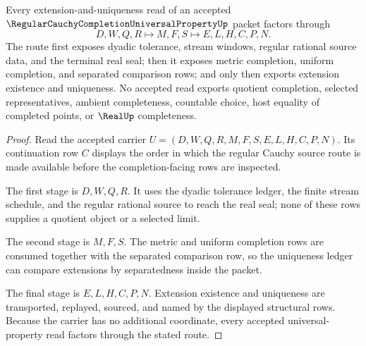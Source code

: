 \begin{theorem}
\label{thm:regular-cauchy-completion-universal-property-core}
Every extension-and-uniqueness read of an accepted $\RegularCauchyCompletionUniversalPropertyUp$ packet factors through
$$
D,W,Q,R \longmapsto M,F,S \longmapsto E,L,H,C,P,N .
$$
The route first exposes dyadic tolerance, stream windows, regular rational source data, and the terminal real seal; then it exposes metric completion, uniform completion, and separated comparison rows; and only then exports extension existence and uniqueness. No accepted read exports quotient completion, selected representatives, ambient completeness, countable choice, host equality of completed points, or $\RealUp$ completeness.
\end{theorem}
\begin{proof}
Read the accepted carrier $U=(D,W,Q,R,M,F,S,E,L,H,C,P,N)$. Its continuation row $C$ displays the order in which the regular Cauchy source route is made available before the completion-facing rows are inspected.

The first stage is $D,W,Q,R$. It uses the dyadic tolerance ledger, the finite stream schedule, and the regular rational source to reach the real seal; none of these rows supplies a quotient object or a selected limit.

The second stage is $M,F,S$. The metric and uniform completion rows are consumed together with the separated comparison row, so the uniqueness ledger can compare extensions by separatedness inside the packet.

The final stage is $E,L,H,C,P,N$. Extension existence and uniqueness are transported, replayed, sourced, and named by the displayed structural rows. Because the carrier has no additional coordinate, every accepted universal-property read factors through the stated route.
\end{proof}

